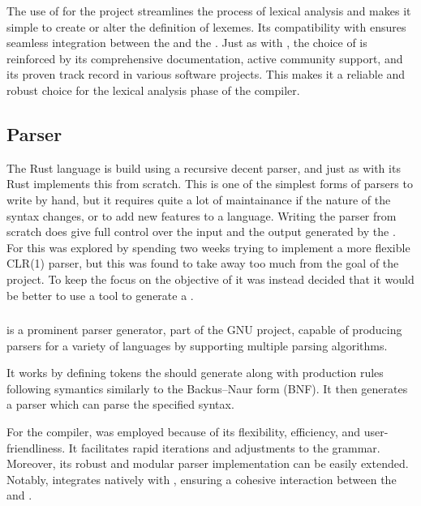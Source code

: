 The use of \lexerGen{} for the \lang{} project streamlines the process of lexical
analysis and makes it simple to create or alter the definition of lexemes. Its
compatibility with \parserGen{} ensures seamless integration between the \lexer{} and
the \parser. Just as with \parserGen, the choice of \lexerGen{} is reinforced by its
comprehensive documentation, active community support, and its proven track record in
various software projects. This makes it a reliable and robust choice for the lexical
analysis phase of the \lang{} compiler.

\subsection{Parser}
\label{sec:techParser}

The Rust language is build using a recursive decent parser, and just as with its
\lexer{} Rust implements this from scratch\cite{RUST_COMPILER_SRC}. This is one of
the simplest forms of parsers to write by hand, but it requires quite a lot of
maintainance if the nature of the syntax changes, or to add new features to a
language. Writing the parser from scratch does give full control over the input
and the output \ast{} generated by the \parser{}. For \lang{} this was explored
by spending two weeks trying to implement a more flexible CLR(1) parser, but this was
found to take away too much from the goal of the project. To keep the focus on the
objective of \lang{} it was instead decided that it would be better to use a tool to
generate a \parser{}.

\subsubsection{\parserGen{}}

\parserGen{} is a prominent parser generator, part of the GNU project, capable of
producing parsers for a variety of languages by supporting multiple parsing
algorithms\cite{BISON}. 

It works by defining tokens the \lexer{} should generate along with production rules
following symantics similarly to the Backus–Naur form (BNF). It then generates a
parser which can parse the specified syntax.

For the \lang{} compiler, \parserGen{} was employed because of its flexibility,
efficiency, and user-friendliness. It facilitates rapid iterations and adjustments to
the grammar. Moreover, its robust and modular parser implementation can be easily
extended. Notably, \parserGen{} integrates natively with \lexerGen{}, ensuring a
cohesive interaction between the \lexer{} and \parser{}.

